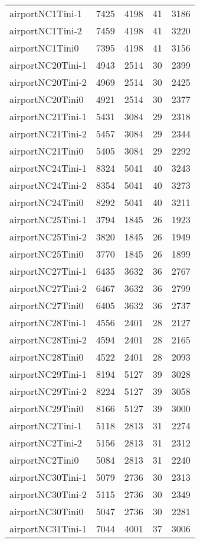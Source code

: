 \begin{longtable}{lrrrr}
airportNC1Tini-1 & 7425 & 4198 & 41 & 3186 \\
airportNC1Tini-2 & 7459 & 4198 & 41 & 3220 \\
airportNC1Tini0 & 7395 & 4198 & 41 & 3156 \\
airportNC20Tini-1 & 4943 & 2514 & 30 & 2399 \\
airportNC20Tini-2 & 4969 & 2514 & 30 & 2425 \\
airportNC20Tini0 & 4921 & 2514 & 30 & 2377 \\
airportNC21Tini-1 & 5431 & 3084 & 29 & 2318 \\
airportNC21Tini-2 & 5457 & 3084 & 29 & 2344 \\
airportNC21Tini0 & 5405 & 3084 & 29 & 2292 \\
airportNC24Tini-1 & 8324 & 5041 & 40 & 3243 \\
airportNC24Tini-2 & 8354 & 5041 & 40 & 3273 \\
airportNC24Tini0 & 8292 & 5041 & 40 & 3211 \\
airportNC25Tini-1 & 3794 & 1845 & 26 & 1923 \\
airportNC25Tini-2 & 3820 & 1845 & 26 & 1949 \\
airportNC25Tini0 & 3770 & 1845 & 26 & 1899 \\
airportNC27Tini-1 & 6435 & 3632 & 36 & 2767 \\
airportNC27Tini-2 & 6467 & 3632 & 36 & 2799 \\
airportNC27Tini0 & 6405 & 3632 & 36 & 2737 \\
airportNC28Tini-1 & 4556 & 2401 & 28 & 2127 \\
airportNC28Tini-2 & 4594 & 2401 & 28 & 2165 \\
airportNC28Tini0 & 4522 & 2401 & 28 & 2093 \\
airportNC29Tini-1 & 8194 & 5127 & 39 & 3028 \\
airportNC29Tini-2 & 8224 & 5127 & 39 & 3058 \\
airportNC29Tini0 & 8166 & 5127 & 39 & 3000 \\
airportNC2Tini-1 & 5118 & 2813 & 31 & 2274 \\
airportNC2Tini-2 & 5156 & 2813 & 31 & 2312 \\
airportNC2Tini0 & 5084 & 2813 & 31 & 2240 \\
airportNC30Tini-1 & 5079 & 2736 & 30 & 2313 \\
airportNC30Tini-2 & 5115 & 2736 & 30 & 2349 \\
airportNC30Tini0 & 5047 & 2736 & 30 & 2281 \\
airportNC31Tini-1 & 7044 & 4001 & 37 & 3006 \\

\end{longtable}
